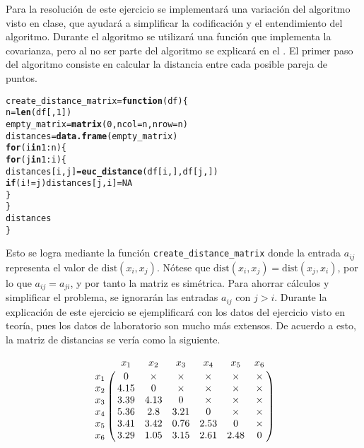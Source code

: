 \documentclass[12pt]{report}\usepackage[]{graphicx}\usepackage[dvipsnames]{xcolor}
\makeatletter
\newcommand{\hlnum}[1]{\textcolor[rgb]{0.686,0.059,0.569}{#1}}%
\newcommand{\hlopt}[1]{\textcolor[rgb]{0,0,0}{#1}}%
\newcommand{\hlstd}[1]{\textcolor[rgb]{0.345,0.345,0.345}{#1}}%
\newcommand{\hlkwa}[1]{\textcolor[rgb]{0.161,0.373,0.58}{\textbf{#1}}}%
\newcommand{\hlkwb}[1]{\textcolor[rgb]{0.69,0.353,0.396}{#1}}%
\newcommand{\hlkwc}[1]{\textcolor[rgb]{0.333,0.667,0.333}{#1}}%
\newcommand{\hlkwd}[1]{\textcolor[rgb]{0.737,0.353,0.396}{\textbf{#1}}}%
\newenvironment{kframe}{%
 \def\at@end@of@kframe{}%
 \ifinner\ifhmode%
  \def\at@end@of@kframe{\end{minipage}}%
  \begin{minipage}{\columnwidth}%
 \fi\fi%
 \def\FrameCommand##1{\hskip\@totalleftmargin \hskip-\fboxsep
 \colorbox{shadecolor}{##1}\hskip-\fboxsep
     \hskip-\linewidth \hskip-\@totalleftmargin \hskip\columnwidth}%
 \MakeFramed {\advance\hsize-\width
   \@totalleftmargin\z@ \linewidth\hsize
   \@setminipage}}%
 {\par\unskip\endMakeFramed%
 \at@end@of@kframe}
\newenvironment{knitrout}{}{} %
\newcommand{\dt}{\text{dist}}
\makeatother
\begin{document}
		 		Para la resolución de este ejercicio se implementará una variación del algoritmo visto en clase, que ayudará a simplificar la codificación y el entendimiento del algoritmo. Durante el algoritmo se utilizará una función que implementa la covarianza, pero al no ser parte del algoritmo se explicará en el . El primer paso del algoritmo consiste en calcular la distancia entre cada posible pareja de puntos. 
		 		
\begin{knitrout}
\color{fgcolor}\begin{kframe}
\begin{alltt}
\hlstd{create_distance_matrix} \hlkwb{=} \hlkwa{function}\hlstd{(}\hlkwc{df}\hlstd{) \{}
        \hlstd{n} \hlkwb{=} \hlkwd{len}\hlstd{(df[,}\hlnum{1}\hlstd{])}
        \hlstd{empty_matrix} \hlkwb{=} \hlkwd{matrix}\hlstd{(}\hlnum{0}\hlstd{,} \hlkwc{ncol} \hlstd{= n,} \hlkwc{nrow} \hlstd{= n)}
        \hlstd{distances} \hlkwb{=} \hlkwd{data.frame}\hlstd{(empty_matrix)}
        \hlkwa{for} \hlstd{(i} \hlkwa{in} \hlnum{1}\hlopt{:}\hlstd{n) \{}
                \hlkwa{for} \hlstd{(j} \hlkwa{in} \hlnum{1}\hlopt{:}\hlstd{i) \{}
                        \hlstd{distances[i, j]} \hlkwb{=} \hlkwd{euc_distance}\hlstd{(df[i,], df[j,])}
                        \hlkwa{if} \hlstd{(i} \hlopt{!=} \hlstd{j) distances[j, i]} \hlkwb{=} \hlnum{NA}
                \hlstd{\}}
        \hlstd{\}}
        \hlstd{distances}
\hlstd{\}}
\end{alltt}
\end{kframe}
\end{knitrout}
		 		
		 		Esto se logra mediante la función \texttt{create\_distance\_matrix} donde la entrada $a_{ij}$ representa el valor de $\dt(x_i, x_j)$. Nótese que $\dt(x_i, x_j) = \dt(x_j, x_i)$, por lo que $a_{ij} = a_{ji}$, y por tanto la matriz es simétrica. Para ahorrar cálculos y simplificar el problema, se ignorarán las entradas $a_{ij}$ con $j > i$. Durante la explicación de este ejercicio se ejemplificará con los datos del ejercicio visto en teoría, pues los datos de laboratorio son mucho más extensos. De acuerdo a esto, la matriz de distancias se vería como la siguiente. 
		 		
		 		$$
		 		\bordermatrix{
		 			& x_1 & x_2 & x_3 & x_4 & x_5 & x_6 \cr
		 			x_1 & 0 & \times & \times & \times & \times & \times\cr
		 			x_2 & 4.15 & 0 & \times & \times & \times & \times\cr
		 			x_3 & 3.39 & 4.13 & 0 & \times & \times & \times\cr
		 			x_4 & 5.36 & 2.8 & 3.21 & 0 & \times & \times\cr
		 			x_5 & 3.41 & 3.42 & 0.76 & 2.53 & 0 & \times\cr
		 			x_6 & 3.29 & 1.05 & 3.15 & 2.61 & 2.48 & 0
		 		}
		 		$$
		 		
\end{document}
